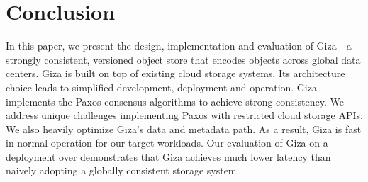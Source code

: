 \section{Conclusion}

In this paper, we present the design, implementation and evaluation of Giza - a strongly consistent, versioned object store that encodes objects across global data centers. Giza is built on top of existing cloud storage systems. 
Its architecture choice leads to simplified development, deployment and operation. Giza implements the Paxos consensus algorithms to achieve strong consistency. We address unique challenges implementing Paxos with restricted cloud storage APIs. We also heavily optimize Giza's data and metadata path. As a result, Giza is fast in normal operation for our target workloads.
Our evaluation of Giza on a deployment over \deployment demonstrates that Giza achieves much lower latency than naively adopting a globally consistent storage system.

